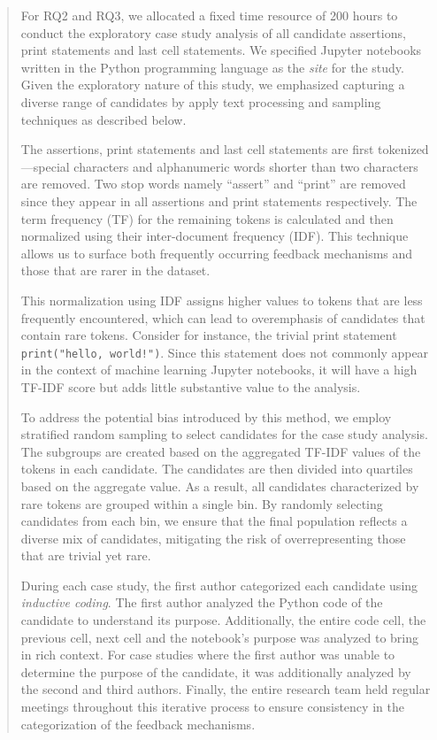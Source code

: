 \documentclass[11pt,fleqn]{article}
\begin{document}
\begin{quote}
  For RQ2 and RQ3, we allocated a fixed time resource of 200 hours to conduct the exploratory case study analysis of all candidate assertions, print statements and last cell statements. We specified Jupyter notebooks written in the Python programming language as the \emph{site} for the study. Given the exploratory nature of this study, we emphasized capturing a diverse range of candidates by apply text processing and sampling techniques as described below.

  The assertions, print statements and last cell statements are first tokenized---special characters and alphanumeric words shorter than two characters are removed. Two stop words namely ``assert'' and ``print'' are removed since they appear in all assertions and print statements respectively. The term frequency (TF) for the remaining tokens is calculated and then normalized using their inter-document frequency (IDF). This technique allows us to surface both frequently occurring feedback mechanisms and those that are rarer in the dataset.

  This normalization using IDF assigns higher values to tokens that are less frequently encountered, which can lead to overemphasis of candidates that contain rare tokens. Consider for instance, the trivial print statement \texttt{print("hello, world!")}. Since this statement does not commonly appear in the context of machine learning Jupyter notebooks, it will have a high TF-IDF score but adds little substantive value to the analysis.

  To address the potential bias introduced by this method, we employ stratified random sampling to select candidates for the case study analysis. The subgroups are created based on the aggregated TF-IDF values of the tokens in each candidate. The candidates are then divided into quartiles based on the aggregate value. As a result, all candidates characterized by rare tokens are grouped within a single bin. By randomly selecting candidates from each bin, we ensure that the final population reflects a diverse mix of candidates, mitigating the risk of overrepresenting those that are trivial yet rare.

  During each case study, the first author categorized each candidate using \emph{inductive coding}. The first author analyzed the Python code of the candidate to understand its purpose. Additionally, the entire code cell, the previous cell, next cell and the notebook's purpose was analyzed to bring in rich context. For case studies where the first author was unable to determine the purpose of the candidate, it was additionally analyzed by the second and third authors. Finally, the entire research team held regular meetings throughout this iterative process to ensure consistency in the categorization of the feedback mechanisms.


\end{quote}
\end{document}
